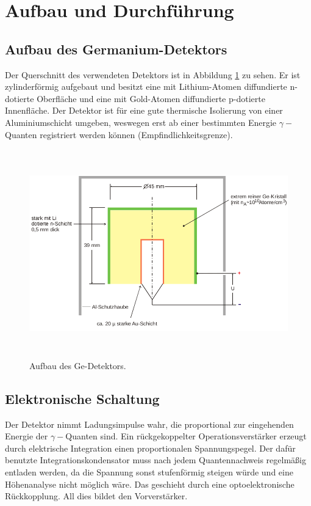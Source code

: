 \newpage
\section{Aufbau und Durchführung}
\label{sec:Durchfuehrung}
\subsection{Aufbau des Germanium-Detektors}
Der Querschnitt des verwendeten Detektors ist in Abbildung \ref{fig:Detektor} zu sehen.
Er ist zylinderförmig aufgebaut und besitzt eine mit Lithium-Atomen diffundierte n-dotierte Oberfläche und eine mit Gold-Atomen diffundierte p-dotierte Innenfläche.
Der Detektor ist für eine gute thermische Isolierung von einer Aluminiumschicht umgeben, weswegen erst ab einer bestimmten Energie $\gamma-$Quanten registriert werden können (Empfindlichkeitsgrenze).
 \begin{figure}
   \centering
   \includegraphics[height=9cm]{content/Detektor.png}
   \caption{Aufbau des Ge-Detektors.\cite{V18}}
   \label{fig:Detektor}
 \end{figure}
\subsection{Elektronische Schaltung}
Der Detektor nimmt Ladungsimpulse wahr, die proportional zur eingehenden Energie der $\gamma-$Quanten sind.
Ein rückgekoppelter Operationsverstärker erzeugt durch elektrische Integration einen proportionalen Spannungspegel.
Der dafür benutzte Integrationskondensator muss nach jedem Quantennachweis regelmäßig entladen werden, da die Spannung sonst stufenförmig steigen würde und eine Höhenanalyse nicht möglich wäre.
Das geschieht durch eine optoelektronische Rückkopplung.
All dies bildet den Vorverstärker.


